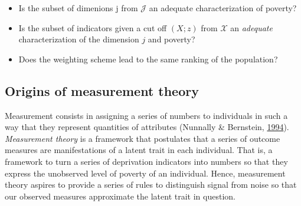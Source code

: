 \documentclass[]{book}
\providecommand{\tightlist}{%
  \setlength{\itemsep}{0pt}\setlength{\parskip}{0pt}}
\begin{document}
\begin{itemize}
\tightlist
\item
  Is the subset of dimenions j from \(\mathscr J\) an adequate characterization of
  poverty?
\item
  Is the subset of indicators given a cut off \((X;z)\) from \(\mathscr X\) an \emph{adequate} characterization of the dimension \(j\) and poverty?
\item
  Does the weighting scheme lead to the same ranking of the population?
\end{itemize}

\hypertarget{origins-of-measurement-theory}{%
\subsection{Origins of measurement theory}\label{origins-of-measurement-theory}}

Measurement consists in assigning a series of numbers to individuals in such a way that they represent quantities of attributes (Nunnally \& Bernstein, \protect\hyperlink{ref-Nunnally1994}{1994}). \emph{Measurement theory} is a framework that postulates that a series of outcome measures are manifestations of a latent trait in each individual. That is, a framework to turn a series of deprivation indicators into numbers so that they express the unobserved level of poverty of an individual. Hence, measurement theory aspires to provide a series of rules to distinguish signal from noise so that our observed measures approximate the latent trait in question.
\end{document}
